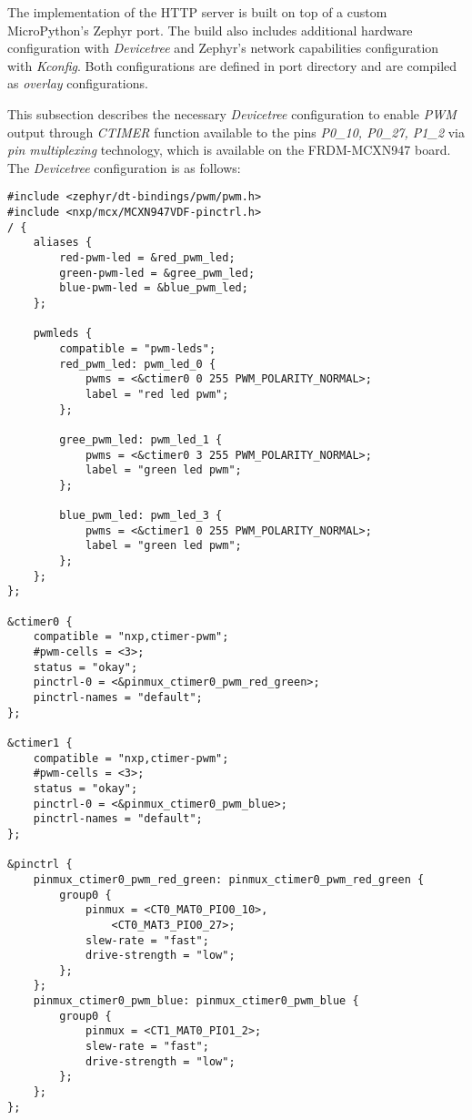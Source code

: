 \documentclass[twoside, 12pt]{article}
\begin{document}
The implementation of the HTTP server is built on top of a custom MicroPython's Zephyr port. 
The build also includes additional hardware configuration with \textit{Devicetree} and 
Zephyr's network capabilities configuration with \textit{Kconfig}. Both configurations are 
defined in port directory and are compiled as \textit{overlay} configurations. 

This subsection describes the necessary \textit{Devicetree} configuration to enable 
\textit{PWM} output through \textit{CTIMER} function available to the pins \textit{P0\_10, P0\_27, P1\_2} via \textit{pin multiplexing} technology\cite{mcx_manual}, which is available 
on the FRDM-MCXN947 board. The \textit{Devicetree} configuration is as follows:
\begin{lstlisting}[caption={Configuring PWM support through CTIMER functionality on FRDM-MCXN947 pins P0\_10, P0\_27 and P1\_2 with Devicetree},breaklines=true]
#include <zephyr/dt-bindings/pwm/pwm.h>
#include <nxp/mcx/MCXN947VDF-pinctrl.h>
/ {
    aliases {
        red-pwm-led = &red_pwm_led;
        green-pwm-led = &gree_pwm_led;
        blue-pwm-led = &blue_pwm_led;
    };

    pwmleds {
        compatible = "pwm-leds";
        red_pwm_led: pwm_led_0 {
            pwms = <&ctimer0 0 255 PWM_POLARITY_NORMAL>;
            label = "red led pwm";
        };

        gree_pwm_led: pwm_led_1 {
            pwms = <&ctimer0 3 255 PWM_POLARITY_NORMAL>;
            label = "green led pwm";
        };

        blue_pwm_led: pwm_led_3 {
            pwms = <&ctimer1 0 255 PWM_POLARITY_NORMAL>;
            label = "green led pwm";
        };
    };
};

&ctimer0 {
    compatible = "nxp,ctimer-pwm";
    #pwm-cells = <3>;
    status = "okay";
    pinctrl-0 = <&pinmux_ctimer0_pwm_red_green>;
	pinctrl-names = "default";
};

&ctimer1 {
    compatible = "nxp,ctimer-pwm";
    #pwm-cells = <3>;
    status = "okay";
    pinctrl-0 = <&pinmux_ctimer0_pwm_blue>;
	pinctrl-names = "default";
};

&pinctrl {
    pinmux_ctimer0_pwm_red_green: pinmux_ctimer0_pwm_red_green {
        group0 {
            pinmux = <CT0_MAT0_PIO0_10>,
                <CT0_MAT3_PIO0_27>;
            slew-rate = "fast";
            drive-strength = "low";
        };
    };
    pinmux_ctimer0_pwm_blue: pinmux_ctimer0_pwm_blue {
        group0 {
            pinmux = <CT1_MAT0_PIO1_2>;
            slew-rate = "fast";
            drive-strength = "low";
        };
    };
};
\end{lstlisting}
\end{document}
